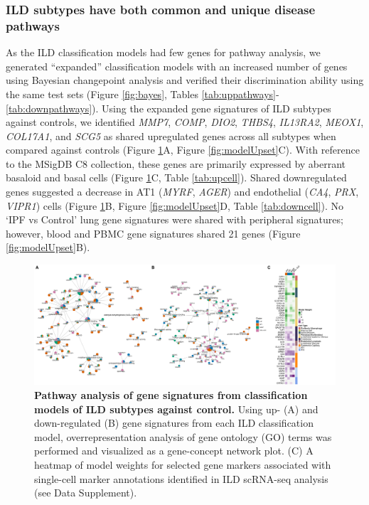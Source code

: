 \documentclass[
]{article}
\begin{document}
\subsubsection{ILD subtypes have both common and unique disease pathways}\label{ild-subtypes-have-both-common-and-unique-disease-pathways}

As the ILD classification models had few genes for pathway analysis, we generated ``expanded'' classification models with an increased number of genes using Bayesian changepoint analysis and verified their discrimination ability using the same test sets (Figure \ref{fig:bayes}, Tables \ref{tab:uppathways}-\ref{tab:downpathways}). Using the expanded gene signatures of ILD subtypes against controls, we identified \textit{MMP7}, \textit{COMP}, \textit{DIO2}, \textit{THBS4}, \textit{IL13RA2}, \textit{MEOX1}, \textit{COL17A1}, and \textit{SCG5} as shared upregulated genes across all subtypes when compared against controls (Figure \ref{fig:ILDpathways}A, Figure \ref{fig:modelUpset}C). With reference to the MSigDB C8 collection, these genes are primarily expressed by aberrant basaloid and basal cells (Figure \ref{fig:ILDpathways}C, Table \ref{tab:upcell}). Shared downregulated genes suggested a decrease in AT1 (\textit{MYRF}, \textit{AGER}) and endothelial (\textit{CA4}, \textit{PRX}, \textit{VIPR1}) cells (Figure \ref{fig:ILDpathways}B, Figure \ref{fig:modelUpset}D, Table \ref{tab:downcell}). No `IPF vs Control' lung gene signatures were shared with peripheral signatures; however, blood and PBMC gene signatures shared 21 genes (Figure \ref{fig:modelUpset}B).



\begin{figure}

{\centering \includegraphics[width=1\linewidth,]{./Figures/SysReview/Figure5_pathways} 

}

\caption[Pathways of ILD]{\textbf{Pathway analysis of gene signatures from classification models of ILD subtypes against control.} Using up- (A) and down-regulated (B) gene signatures from each ILD classification model, overrepresentation analysis of gene ontology (GO) terms was performed and visualized as a gene-concept network plot. (C) A heatmap of model weights for selected gene markers associated with single-cell marker annotations identified in ILD scRNA-seq analysis (see Data Supplement).}\label{fig:ILDpathways}
\end{figure}
\end{document}
